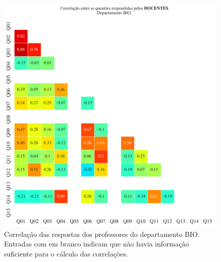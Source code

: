 \documentclass[a4paper,10pt]{article}
\begin{document}
\begin{figure}[h]
\centering
\includegraphics[width=0.999\linewidth]{matriz_corr__BIO_docentes.png}
\caption{\label{fig:corr_docentes}Correlação das respostas dos professores do departamento BIO. Entradas com em branco indicam que não havia informação suficiente para o cálculo das correlações.}
\end{figure}
\end{document}
